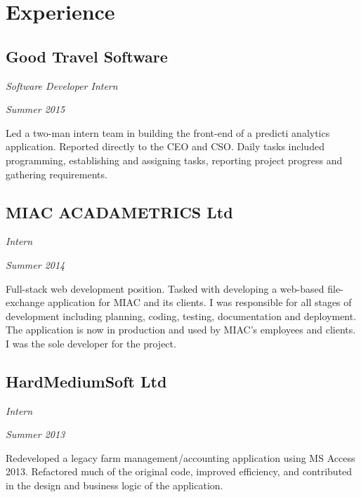 \section*{Experience}

\subsection*{Good Travel Software}
\begin{minipage}[b]{0.5\textwidth}
  \flushleft
  \emph{Software Developer Intern}
\end{minipage}
\begin{minipage}[b]{0.5\textwidth}
  \flushright
  \emph{Summer 2015}
\end{minipage}
Led a two-man intern team in building the front-end of a predicti analytics application. Reported directly to the CEO and CSO. Daily tasks included programming, establishing and assigning tasks, reporting project progress and gathering requirements.

\subsection*{MIAC ACADAMETRICS Ltd}
\begin{minipage}[b]{0.5\textwidth}
  \flushleft
  \emph{Intern}
\end{minipage}
\begin{minipage}[b]{0.5\textwidth}
  \flushright
  \emph{Summer 2014}
\end{minipage}
Full-stack web development position. Tasked with developing a web-based  file-exchange application for MIAC and its clients. I was responsible for all stages of development including planning, coding, testing, documentation and deployment. The application is now in production and used by MIAC’s employees and clients. I was the sole developer for the project.

\subsection*{HardMediumSoft Ltd}
\begin{minipage}[b]{0.5\textwidth}
  \flushleft
  \emph{Intern}
\end{minipage}
\begin{minipage}[b]{0.5\textwidth}
  \flushright
  \emph{Summer 2013}
\end{minipage}
Redeveloped a legacy farm management/accounting application using MS Access 2013. Refactored much of the original code, improved efficiency, and contributed in the design and business logic of the application.

